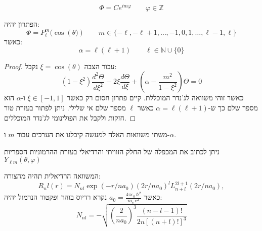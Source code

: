 \documentclass{tstextbook}
\begin{document}
\begin{proposition}
$$\Phi= C e^{ im\varphi }\qquad \varphi \in \mathbb{Z}$$

\end{proposition}
\begin{proposition}
הפתרון יהיה:
$$\Phi=P_{\ell}^{m}(\cos\left( \theta ) \right)\qquad  m \in \{ -\ell,-\ell+1, \dots, -1,0,1,\dots, \ell-1, \ell \}$$
כאשר:
$$\alpha=\ell\left(\ell+1\right)\qquad  \ell \in \mathbb{N} \cup \{ 0 \}$$

\end{proposition}
\begin{proof}
עבור הצבה \(\xi=\cos(\theta)\) נקבל:
$$\left(1-\xi^{2}\right)\frac{d^{2}\Theta}{d\xi^{2}}-2\xi\frac{d\Theta}{d\xi}+\left(\alpha-\frac{m^{2}}{1-\xi^{2}}\right)\Theta=0$$
כאשר זוהי משוואה לג'נדר המוכללת. קיים פתרון חסום רק כאשר \(\xi \in [-1,1]\) ו-\(\alpha\) הוא מספר שלם כך ש-\(\alpha = \ell\left( \ell+1 \right)\) כאשר \(\ell\) מספר שלם אי שלילי. ניתן לפתור בעזרת טור חזקות ולקבל את הפולינומי לג'נדר המוכללים.

\end{proof}
\begin{remark}
משתי משוואות האלה למעשה קיבלנו את הערכים עבור \(m\) ו-\(\alpha\).

\end{remark}
\begin{corollary}
ניתן לכתוב את המכפלה של החלק הזוויתי והרדיאלי בעזרת ההרמוניות הספריות \(Y_{\ell m}\left( \theta,\varphi \right)\)

\end{corollary}
\begin{proposition}
המשוואה הרדיאלית תהיה מהצורה:
$$R_{n}l(r)=N_{n l}\exp(-r/n a_{0})(2r/n a_{0})^{l}L_{n+l}^{2l+1}(2r/n a_{0}),$$
כאשר \(a_{0}={\frac{4\pi\epsilon_{0}\,\hbar^{2}}{m_{e}\,e^{2}}}\) נקרא רדיוס בוהר ופקטור הנרמול יהיה:
$$N_{n l}=-\sqrt{\left(\frac{2}{n a_{0}}\right)^{3}\frac{(n-l-1)!}{2n[(n+l)!]^{3}}}$$

\end{proposition}
\end{document}
